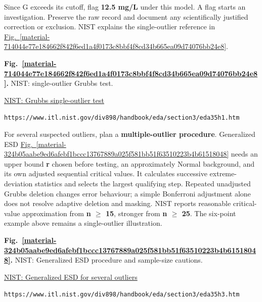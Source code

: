 \documentclass[11pt,a4paper]{article}
\begin{document}
Since G exceeds its cutoff, flag \textbf{12.5 mg/L} under this model. A flag starts an investigation. Preserve the raw record and document any scientifically justified correction or exclusion. NIST explains the single-outlier reference in \hyperref[material-714044e77e184662f842f6ed1a4f0173c8bbf4f8cd34b665ea09d74076bb24e8]{Fig.~\ref*{material-714044e77e184662f842f6ed1a4f0173c8bbf4f8cd34b665ea09d74076bb24e8}}.


\par\medskip
\Needspace{10cm}
\label{material-714044e77e184662f842f6ed1a4f0173c8bbf4f8cd34b665ea09d74076bb24e8}
\noindent\textbf{Fig.~\ref*{material-714044e77e184662f842f6ed1a4f0173c8bbf4f8cd34b665ea09d74076bb24e8}.} NIST: single-outlier Grubbs test.\par\nopagebreak
\noindent\href{https://www.itl.nist.gov/div898/handbook/eda/section3/eda35h1.htm}{NIST: Grubbs single-outlier test}\par
\nolinkurl{https://www.itl.nist.gov/div898/handbook/eda/section3/eda35h1.htm}\par

\medskip

For several suspected outliers, plan a \textbf{multiple-outlier procedure}. Generalized ESD \hyperref[material-324b05aabe9ed6afebf1bccc13767889a025f581bb51f63510223b4b61518048]{Fig.~\ref*{material-324b05aabe9ed6afebf1bccc13767889a025f581bb51f63510223b4b61518048}} needs an upper bound \textbf{r} chosen before testing, an approximately Normal background, and its own adjusted sequential critical values. It calculates successive extreme-deviation statistics and selects the largest qualifying step. Repeated unadjusted Grubbs deletion changes error behaviour; a simple Bonferroni adjustment alone does not resolve adaptive deletion and masking. NIST reports reasonable critical-value approximation from \textbf{n \ensuremath{\ge} 15}, stronger from \textbf{n \ensuremath{\ge} 25}. The six-point example above remains a single-outlier illustration.


\par\medskip
\Needspace{10cm}
\label{material-324b05aabe9ed6afebf1bccc13767889a025f581bb51f63510223b4b61518048}
\noindent\textbf{Fig.~\ref*{material-324b05aabe9ed6afebf1bccc13767889a025f581bb51f63510223b4b61518048}.} NIST: Generalized ESD procedure and sample-size cautions.\par\nopagebreak
\noindent\href{https://www.itl.nist.gov/div898/handbook/eda/section3/eda35h3.htm}{NIST: Generalized ESD for several outliers}\par
\nolinkurl{https://www.itl.nist.gov/div898/handbook/eda/section3/eda35h3.htm}\par

\medskip
\end{document}
